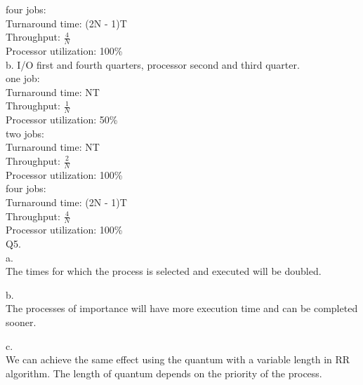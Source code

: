\documentclass[a4paper, tikz, border=10pt]{article}
\begin{document}
four jobs:\\
Turnaround time: (2N - 1)T\\
Throughput: $\frac{4}{N}$\\
Processor utilization: 100\%\\

b. I/O first and fourth quarters, processor second and third quarter. \\
one job:\\
Turnaround time: NT\\
Throughput: $\frac{1}{N}$\\
Processor utilization: 50\%\\

two jobs:\\
Turnaround time: NT\\
Throughput: $\frac{2}{N}$\\
Processor utilization: 100\%\\

four jobs:\\
Turnaround time: (2N - 1)T\\
Throughput: $\frac{4}{N}$\\
Processor utilization: 100\%\\

Q5.\\
a.\\
The times for which the process is selected and executed will be doubled.

b.\\
The processes of importance will have more execution time and can be completed sooner.

c.\\
We can achieve the same effect using the quantum with a variable length in RR algorithm.
The length of quantum depends on the priority of the process.
\end{document}
